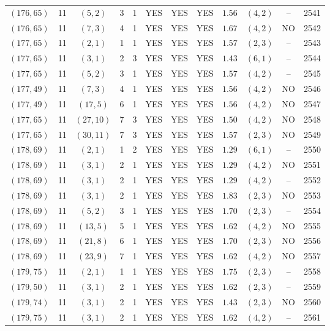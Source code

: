 \begin{longtable}{|c|c|c|c|c|c|c|c|c|c|c|c|}
$(176,65)$ & 11 & $(5,2)$ & 3 & 1 & YES & YES & YES & $1.56$ & $(4,2)$ & -- & 2541\\
$(176,65)$ & 11 & $(7,3)$ & 4 & 1 & YES & YES & YES & $1.67$ & $(4,2)$ & NO & 2542\\
$(177,65)$ & 11 & $(2,1)$ & 1 & 1 & YES & YES & YES & $1.57$ & $(2,3)$ & -- & 2543\\
$(177,65)$ & 11 & $(3,1)$ & 2 & 3 & YES & YES & YES & $1.43$ & $(6,1)$ & -- & 2544\\
$(177,65)$ & 11 & $(5,2)$ & 3 & 1 & YES & YES & YES & $1.57$ & $(4,2)$ & -- & 2545\\
$(177,49)$ & 11 & $(7,3)$ & 4 & 1 & YES & YES & YES & $1.56$ & $(4,2)$ & NO & 2546\\
$(177,49)$ & 11 & $(17,5)$ & 6 & 1 & YES & YES & YES & $1.56$ & $(4,2)$ & NO & 2547\\
$(177,65)$ & 11 & $(27,10)$ & 7 & 3 & YES & YES & YES & $1.50$ & $(4,2)$ & NO & 2548\\
$(177,65)$ & 11 & $(30,11)$ & 7 & 3 & YES & YES & YES & $1.57$ & $(2,3)$ & NO & 2549\\
$(178,69)$ & 11 & $(2,1)$ & 1 & 2 & YES & YES & YES & $1.29$ & $(6,1)$ & -- & 2550\\
$(178,69)$ & 11 & $(3,1)$ & 2 & 1 & YES & YES & YES & $1.29$ & $(4,2)$ & NO & 2551\\
$(178,69)$ & 11 & $(3,1)$ & 2 & 1 & YES & YES & YES & $1.29$ & $(4,2)$ & -- & 2552\\
$(178,69)$ & 11 & $(3,1)$ & 2 & 1 & YES & YES & YES & $1.83$ & $(2,3)$ & NO & 2553\\
$(178,69)$ & 11 & $(5,2)$ & 3 & 1 & YES & YES & YES & $1.70$ & $(2,3)$ & -- & 2554\\
$(178,69)$ & 11 & $(13,5)$ & 5 & 1 & YES & YES & YES & $1.62$ & $(4,2)$ & NO & 2555\\
$(178,69)$ & 11 & $(21,8)$ & 6 & 1 & YES & YES & YES & $1.70$ & $(2,3)$ & NO & 2556\\
$(178,69)$ & 11 & $(23,9)$ & 7 & 1 & YES & YES & YES & $1.62$ & $(4,2)$ & NO & 2557\\
$(179,75)$ & 11 & $(2,1)$ & 1 & 1 & YES & YES & YES & $1.75$ & $(2,3)$ & -- & 2558\\
$(179,50)$ & 11 & $(3,1)$ & 2 & 1 & YES & YES & YES & $1.62$ & $(2,3)$ & -- & 2559\\
$(179,74)$ & 11 & $(3,1)$ & 2 & 1 & YES & YES & YES & $1.43$ & $(2,3)$ & NO & 2560\\
$(179,75)$ & 11 & $(3,1)$ & 2 & 1 & YES & YES & YES & $1.62$ & $(4,2)$ & -- & 2561\\

\end{longtable}
